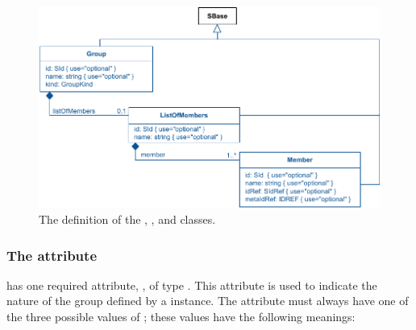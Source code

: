 \begin{figure}[bh]
  \vspace*{-1ex}
  \includegraphics[scale=0.91]{figs/group-uml-v1}
 \caption{The definition of the \Group, \ListOfMembers, and \Member classes.}
  \label{group-uml}
  \label{member-uml}
\end{figure}

\vspace*{-3ex}

\subsubsection{The \fixttspace{} attribute}
\label{kind-attribute}

\Group has one required attribute, , of type .  This attribute is used to indicate the nature of the group defined by a \Group instance.  The  attribute must always have one of the three possible values of ; these values have the following meanings:

